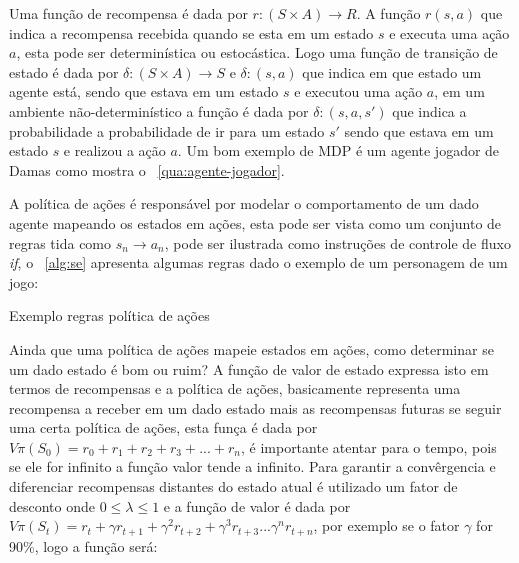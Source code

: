 Uma função de recompensa é dada por  $r: (S \times A) \rightarrow R$. A função $r(s,a)$ que indica a recompensa 
recebida quando se esta em um estado $s$ e executa uma ação $a$, esta pode ser determinística ou estocástica. Logo uma 
função de transição de estado é dada por $\delta:(S \times A) \rightarrow S $ e $\delta:(s,a)$ que indica em que 
estado um agente está, sendo que estava em um estado $s$ e executou uma ação $a$, em um ambiente não-determinístico
a função é dada por $\delta:(s,a,s')$ que indica a probabilidade a probabilidade de ir para um estado $s'$ sendo que
estava em um estado $s$ e realizou a ação $a$.
Um bom exemplo de MDP é um agente jogador de Damas como mostra o ~\autoref{qua:agente-jogador}.

\begin{quadro}[h!]	
	\centering
\end{quadro}  

A política de ações é responsável por modelar o comportamento de um dado agente mapeando os estados em ações, esta pode 
ser vista como um conjunto de regras tida como $s_{n} \rightarrow a_{n}$, pode ser ilustrada como instruções de controle 
de fluxo \textit{if}, o ~\autoref{alg:se} apresenta algumas regras dado o exemplo de um personagem de um jogo:
\begin{algorithm}[h!]
	\SetSpacedAlgorithm
	\caption{\label{alg:se}Exemplo regras política de ações}
\end{algorithm}   

Ainda que uma política de ações mapeie estados em ações, como determinar se um dado estado é bom ou ruim?
A função de valor de estado expressa isto em termos de recompensas e a política de ações, basicamente representa
uma recompensa a receber em um dado estado mais as recompensas futuras se seguir uma certa política de ações, esta
funça é dada por $V\pi(S_{0})= r_{0}+r_{1}+r_{2}+r_{3}+ ... + r_{n}$, é importante atentar para o tempo, pois 
se ele for infinito a função valor tende a infinito. Para garantir a convêrgencia e diferenciar recompensas distantes do
estado atual é utilizado um fator de desconto onde $0 \leqslant \lambda \leqslant 1$  e a função de valor é dada por
$V\pi(S_{t})= r_{t} + \gamma r_{t+1} + \gamma^{2} r_{t+2} + \gamma^{3} r_{t+3} ... \gamma^{n} r_{t+n}$, por exemplo
se o fator $\gamma$ for 90\%, logo a função será:

